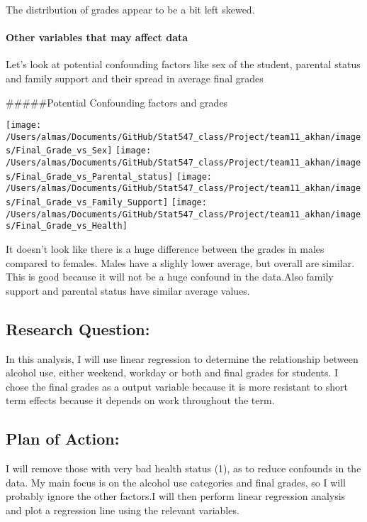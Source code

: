 \documentclass[]{article}
\let\oldparagraph\paragraph
\renewcommand{\paragraph}[1]{\oldparagraph{#1}\mbox{}}
\begin{document}
The distribution of grades appear to be a bit left skewed.

\hypertarget{other-variables-that-may-affect-data}{%
\paragraph{Other variables that may affect
data}\label{other-variables-that-may-affect-data}}

Let's look at potential confounding factors like sex of the student,
parental status and family support and their spread in average final
grades

\#\#\#\#\#Potential Confounding factors and grades

\texttt{[image: /Users/almas/Documents/GitHub/Stat547\_class/Project/team11\_akhan/images/Final\_Grade\_vs\_Sex]}
\texttt{[image: /Users/almas/Documents/GitHub/Stat547\_class/Project/team11\_akhan/images/Final\_Grade\_vs\_Parental\_status]}
\texttt{[image: /Users/almas/Documents/GitHub/Stat547\_class/Project/team11\_akhan/images/Final\_Grade\_vs\_Family\_Support]}
\texttt{[image: /Users/almas/Documents/GitHub/Stat547\_class/Project/team11\_akhan/images/Final\_Grade\_vs\_Health]}

It doesn't look like there is a huge difference between the grades in
males compared to females. Males have a slighly lower average, but
overall are similar. This is good because it will not be a huge confound
in the data.Also family support and parental status have similar average
values.

\hypertarget{research-question}{%
\subsection{Research Question:}\label{research-question}}

In this analysis, I will use linear regression to determine the
relationship between alcohol use, either weekend, workday or both and
final grades for students. I chose the final grades as a output variable
because it is more resistant to short term effects because it depends on
work throughout the term.

\hypertarget{plan-of-action}{%
\subsection{Plan of Action:}\label{plan-of-action}}

I will remove those with very bad health status (1), as to reduce
confounds in the data. My main focus is on the alcohol use categories
and final grades, so I will probably ignore the other factors.I will
then perform linear regression analysis and plot a regression line using
the relevant variables.
\end{document}

